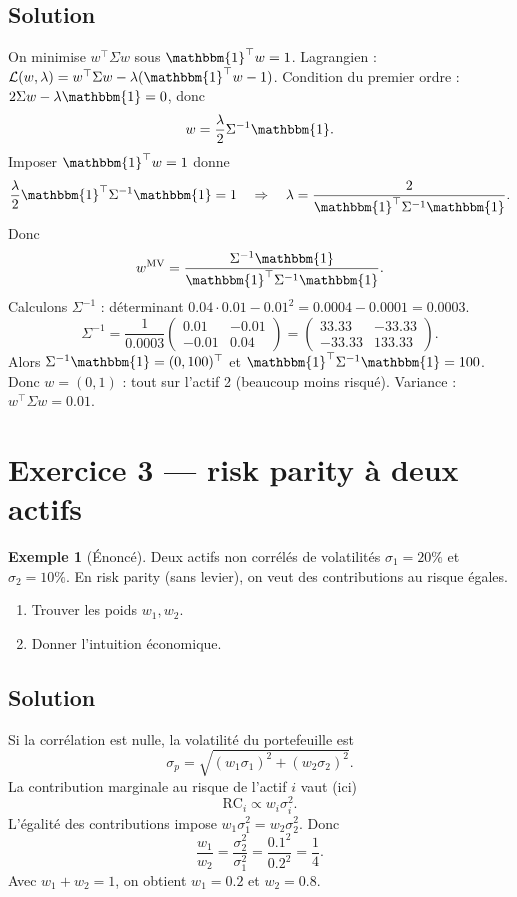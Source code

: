 \documentclass[11pt,a4paper]{report}
\newcommand{\1}{\mathbbm{1}}
\theoremstyle{definition}
\newtheorem{example}{Exemple}[chapter]
\theoremstyle{plain}
\theoremstyle{remark}
\begin{document}
\subsection*{Solution}
On minimise $w^\top\Sigma w$ sous $\1^\top w=1$.
Lagrangien : $\mathcal{L}(w,\lambda)=w^\top\Sigma w-\lambda(\1^\top w-1)$.
Condition du premier ordre : $2\Sigma w-\lambda\1=0$, donc
\[w=\frac{\lambda}{2}\Sigma^{-1}\1.
\]
Imposer $\1^\top w=1$ donne
\[\frac{\lambda}{2}\1^\top\Sigma^{-1}\1=1\quad\Rightarrow\quad \lambda=\frac{2}{\1^\top\Sigma^{-1}\1}.
\]
Donc
\[w^{\mathrm{MV}}=\frac{\Sigma^{-1}\1}{\1^\top\Sigma^{-1}\1}.
\]
Calculons $\Sigma^{-1}$ : déterminant $0.04\cdot 0.01-0.01^2=0.0004-0.0001=0.0003$.
\[\Sigma^{-1}=\frac{1}{0.0003}\begin{pmatrix}0.01 & -0.01\\ -0.01 & 0.04\end{pmatrix}
=\begin{pmatrix}33.33 & -33.33\\ -33.33 & 133.33\end{pmatrix}.
\]
Alors $\Sigma^{-1}\1=(0,100)^{\top}$ et $\1^\top\Sigma^{-1}\1=100$.
Donc $w=(0,1)$ : tout sur l'actif 2 (beaucoup moins risqué).
Variance : $w^\top\Sigma w=0.01$.

\section{Exercice 3 --- risk parity à deux actifs}
\begin{example}[Énoncé]
Deux actifs non corrélés de volatilités $\sigma_1=20\%$ et $\sigma_2=10\%$.
En risk parity (sans levier), on veut des contributions au risque égales.
\begin{enumerate}[label=\alph*)]
  \item Trouver les poids $w_1,w_2$.
  \item Donner l'intuition économique.
\end{enumerate}
\end{example}

\subsection*{Solution}
Si la corrélation est nulle, la volatilité du portefeuille est
\[\sigma_p=\sqrt{(w_1\sigma_1)^2+(w_2\sigma_2)^2}.
\]
La contribution marginale au risque de l'actif $i$ vaut (ici)
\[\mathrm{RC}_i\propto w_i\sigma_i^2.
\]
L'égalité des contributions impose $w_1\sigma_1^2=w_2\sigma_2^2$.
Donc
\[\frac{w_1}{w_2}=\frac{\sigma_2^2}{\sigma_1^2}=\frac{0.1^2}{0.2^2}=\frac{1}{4}.
\]
Avec $w_1+w_2=1$, on obtient $w_1=0.2$ et $w_2=0.8$.
\end{document}
